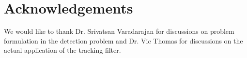 \section*{Acknowledgements}
We would like to thank Dr. Srivatsan Varadarajan for discussions on problem formulation in the detection problem and Dr. Vic Thomas for discussions on the actual application of the tracking filter. 